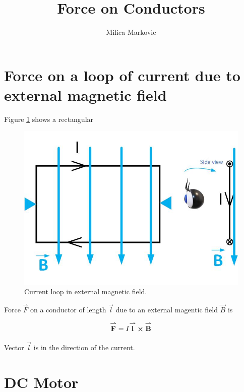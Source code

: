 \documentclass{ximera}
\title{Force on Conductors}
\author{Milica Markovic}
\begin{document}
  
\begin{abstract}  

\end{abstract}  
\maketitle    



\section{Force on a loop of current due to external magnetic field}


Figure \ref{fig:currentLoop} shows a rectangular 


\begin{figure}[htbp]
\begin{center}
\includegraphics[scale=0.5]{../jpg/loop.jpg}
\end{center}
\caption{Current loop in external magnetic field. }
\label{fig:currentLoop}
\end{figure}


Force $\vec{F}$ on a conductor of length $\vec{l}$ due to an external magentic field $\vec{B}$ is

\begin{equation}
{\overset{\boldsymbol{\rightharpoonup}}{\mathbf{F}}}\hspace{0in}=I {\overset{\boldsymbol{\rightharpoonup}}{\mathbf{l}}}\hspace{0in} \boldsymbol\times {\overset{\boldsymbol{\rightharpoonup}}{\mathbf{B}}}\hspace{0in}
\end{equation}

Vector $\vec{l}$ is in the direction of the current.

\section{DC Motor}
\end{document}

